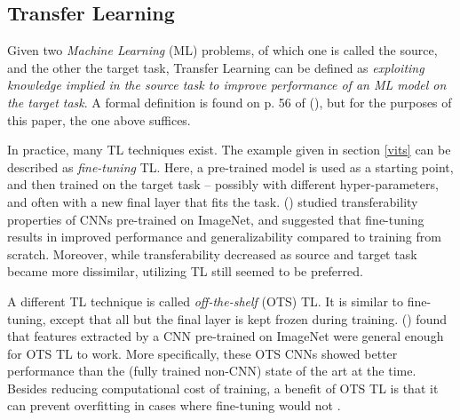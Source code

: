 
\subsection{Transfer Learning}
Given two \textit{Machine Learning} (ML) problems, of which one is called the source, and the other the target task, Transfer Learning can be defined as \textit{exploiting knowledge implied in the source task to improve performance of an ML model on the target task}. A formal definition is found on p. 56 of \citeauthor{sabatelli2022contributions} (\citeyear{sabatelli2022contributions}), but for the purposes of this paper, the one above suffices.

In practice, many TL techniques exist. The example given in section \ref{vits} can be described as \textit{fine-tuning} TL. Here, a pre-trained model is used as a starting point, and then trained on the target task -- possibly with different hyper-parameters, and often with a new final layer that fits the task. \citeauthor{yosinski2014transferable} (\citeyear{yosinski2014transferable}) studied transferability properties of CNNs pre-trained on ImageNet, and suggested that fine-tuning results in improved performance and generalizability compared to training from scratch. Moreover, while transferability decreased as source and target task became more dissimilar, utilizing TL still seemed to be preferred.


A different TL technique is called \textit{off-the-shelf} (OTS) TL. It is similar to fine-tuning, except that all but the final layer is kept frozen during training. \citeauthor{sharif2014cnn} (\citeyear{sharif2014cnn}) found that features extracted by a CNN pre-trained on ImageNet were general enough for OTS TL to work. More specifically, these OTS CNNs showed better performance than the (fully trained non-CNN) state of the art at the time. Besides reducing computational cost of training, a benefit of OTS TL is that it can prevent overfitting in cases where fine-tuning would not \citep{yosinski2014transferable}.

